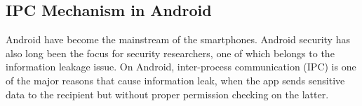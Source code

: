 \subsection{IPC Mechanism in Android}

%
%
%

Android have become the mainstream of the smartphones. Android security has also long been the focus for security researchers, one of which belongs to the information leakage issue.
On Android, inter-process communication (IPC) is one of the major reasons that cause information leak, when the app sends sensitive data to the recipient but without proper permission checking on the latter.

